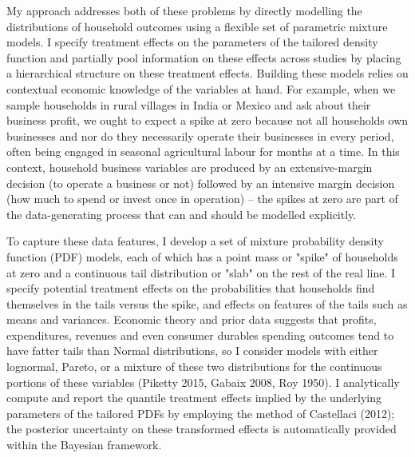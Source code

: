 \documentclass[AER]{AEA}
\begin{document}
My approach addresses both of these problems by directly modelling the distributions of household outcomes using a flexible set of parametric mixture models. I specify treatment effects on the parameters of the tailored density function and partially pool information on these effects across studies by placing a hierarchical structure on these treatment effects. Building these models relies on contextual economic knowledge of the variables at hand. For example, when we sample households in rural villages in India or Mexico and ask about their business profit, we ought to expect a spike at zero because not all households own businesses and nor do they necessarily operate their businesses in every period, often being engaged in seasonal agricultural labour for months at a time. In this context, household business variables are produced by an extensive-margin decision (to operate a business or not) followed by an intensive margin decision (how much to spend or invest once in operation) -- the spikes at zero are part of the data-generating process that can and should be modelled explicitly. 

To capture these data features, I develop a set of mixture probability density function (PDF) models, each of which has a point mass or "spike" of households at zero and a continuous tail distribution or "slab" on the rest of the real line.  I specify potential treatment effects on the probabilities that households find themselves in the tails versus the spike, and effects on features of the tails such as means and variances. Economic theory and prior data suggests that profits, expenditures, revenues and even consumer durables spending outcomes tend to have fatter tails than Normal distributions, so I consider models with either lognormal, Pareto, or a mixture of these two distributions for the continuous portions of these variables (Piketty 2015, Gabaix 2008, Roy 1950). I analytically compute and report the quantile treatment effects implied by the underlying parameters of the tailored PDFs by employing the method of Castellaci (2012); the posterior uncertainty on these transformed effects is automatically provided within the Bayesian framework. 
\end{document}
